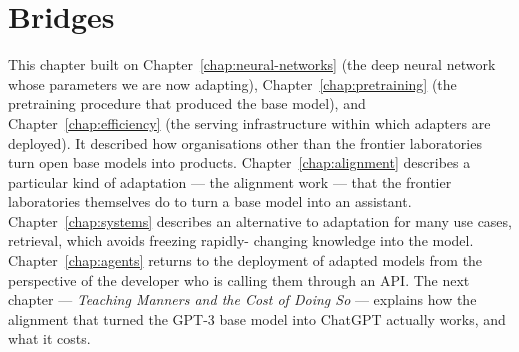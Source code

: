 \section*{Bridges}

This chapter built on Chapter~\ref{chap:neural-networks} (the deep neural network whose
parameters we are now adapting), Chapter~\ref{chap:pretraining} (the pretraining
procedure that produced the base model), and Chapter~\ref{chap:efficiency} (the
serving infrastructure within which adapters are deployed). It
described how organisations other than the frontier laboratories
turn open base models into products. Chapter~\ref{chap:alignment} describes a
particular kind of adaptation --- the alignment work --- that the
frontier laboratories themselves do to turn a base model into
an assistant. Chapter~\ref{chap:systems} describes an alternative to adaptation
for many use cases, retrieval, which avoids freezing rapidly-
changing knowledge into the model. Chapter~\ref{chap:agents} returns to the
deployment of adapted models from the perspective of the
developer who is calling them through an API. The next chapter
--- \emph{Teaching Manners and the Cost of Doing So} --- explains
how the alignment that turned the GPT-3 base model into ChatGPT
actually works, and what it costs.
